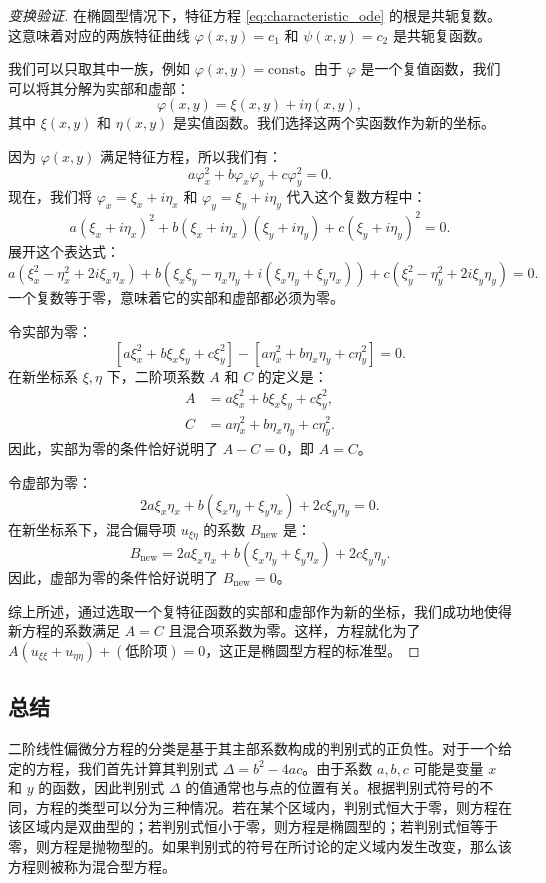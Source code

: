 \documentclass[12pt,a4paper]{article}
\numberwithin{subsection}{section}
\numberwithin{subsubsection}{subsection}
\theoremstyle{plain}
\theoremstyle{definition}
\theoremstyle{remark}
\begin{document}
\begin{proof}[变换验证]
	在椭圆型情况下，特征方程 \eqref{eq:characteristic_ode} 的根是共轭复数。这意味着对应的两族特征曲线 \(\varphi(x,y)=c_1\) 和 \(\psi(x,y)=c_2\) 是共轭复函数。
	
	我们可以只取其中一族，例如 \(\varphi(x,y) = \text{const}\)。由于 \(\varphi\) 是一个复值函数，我们可以将其分解为实部和虚部：
	\[
	\varphi(x,y) = \xi(x,y) + i\eta(x,y),
	\]
	其中 \(\xi(x,y)\) 和 \(\eta(x,y)\) 是实值函数。我们选择这两个实函数作为新的坐标。
	
	因为 \(\varphi(x,y)\) 满足特征方程，所以我们有：
	\begin{equation}\label{eq:complex_char_eq_phi}
		a\varphi_x^2 + b\varphi_x\varphi_y + c\varphi_y^2 = 0.
	\end{equation}
	现在，我们将 \(\varphi_x = \xi_x + i\eta_x\) 和 \(\varphi_y = \xi_y + i\eta_y\) 代入这个复数方程中：
	\[
	a(\xi_x + i\eta_x)^2 + b(\xi_x + i\eta_x)(\xi_y + i\eta_y) + c(\xi_y + i\eta_y)^2 = 0.
	\]
	展开这个表达式：
	\[
	a(\xi_x^2 - \eta_x^2 + 2i\xi_x\eta_x) + b(\xi_x\xi_y - \eta_x\eta_y + i(\xi_x\eta_y + \xi_y\eta_x)) + c(\xi_y^2 - \eta_y^2 + 2i\xi_y\eta_y) = 0.
	\]
	一个复数等于零，意味着它的实部和虚部都必须为零。
	
令实部为零：
	\[
	[a\xi_x^2 + b\xi_x\xi_y + c\xi_y^2] - [a\eta_x^2 + b\eta_x\eta_y + c\eta_y^2] = 0.
	\]
	在新坐标系 \(\xi, \eta\) 下，二阶项系数 \(A\) 和 \(C\) 的定义是：
	\begin{align*}
		A &= a\xi_x^2 + b\xi_x\xi_y + c\xi_y^2, \\
		C &= a\eta_x^2 + b\eta_x\eta_y + c\eta_y^2.
	\end{align*}
	因此，实部为零的条件恰好说明了 \(A - C = 0\)，即 \(A=C\)。
	
令虚部为零：
	\[
	2a\xi_x\eta_x + b(\xi_x\eta_y + \xi_y\eta_x) + 2c\xi_y\eta_y = 0.
	\]
	在新坐标系下，混合偏导项 \(u_{\xi\eta}\) 的系数 \(B_\text{new}\) 是：
	\[
	B_\text{new} = 2a\xi_x\eta_x + b(\xi_x\eta_y + \xi_y\eta_x) + 2c\xi_y\eta_y.
	\]
	因此，虚部为零的条件恰好说明了 \(B_\text{new} = 0\)。
	
	综上所述，通过选取一个复特征函数的实部和虚部作为新的坐标，我们成功地使得新方程的系数满足 \(A=C\) 且混合项系数为零。这样，方程就化为了 \(A(u_{\xi\xi} + u_{\eta\eta}) + (\text{低阶项}) = 0\)，这正是椭圆型方程的标准型。
\end{proof}

\subsection{总结}
二阶线性偏微分方程的分类是基于其主部系数构成的判别式的正负性。对于一个给定的方程，我们首先计算其判别式 \(\Delta = b^2 - 4ac\)。由于系数 \(a, b, c\) 可能是变量 \(x\) 和 \(y\) 的函数，因此判别式 \(\Delta\) 的值通常也与点的位置有关。根据判别式符号的不同，方程的类型可以分为三种情况。若在某个区域内，判别式恒大于零，则方程在该区域内是双曲型的；若判别式恒小于零，则方程是椭圆型的；若判别式恒等于零，则方程是抛物型的。如果判别式的符号在所讨论的定义域内发生改变，那么该方程则被称为混合型方程。
\end{document}
